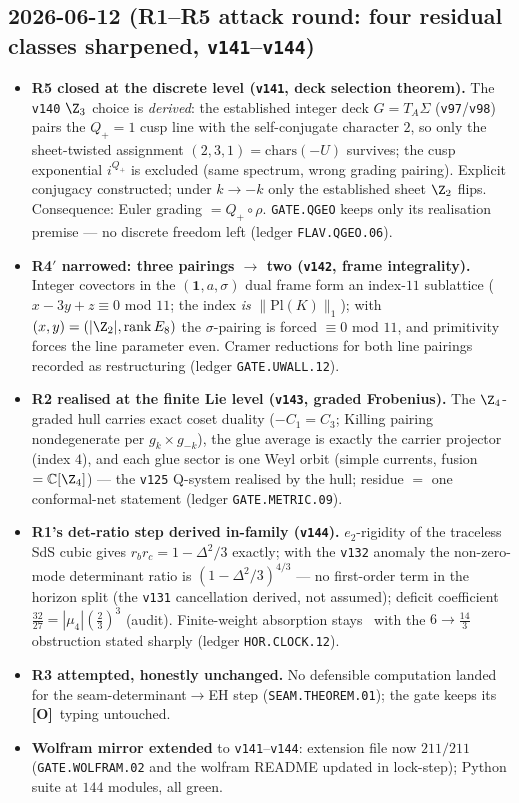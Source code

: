 \documentclass[11pt]{article}
\providecommand{\mO}{\textbf{[O]}}\providecommand{\mX}{\textbf{[X]}}
\providecommand{\vref}[1]{\texttt{#1}}
\begin{document}
\subsection*{2026-06-12 (R1--R5 attack round: four residual classes sharpened, \vref{v141}--\vref{v144})}
\begin{itemize}
\item \textbf{R5 closed at the discrete level (\vref{v141}, deck selection theorem).} The
  \vref{v140} $\Z_3$ choice is \emph{derived}: the established integer deck $G=T_A\Sigma$
  (\vref{v97}/\vref{v98}) pairs the $Q_+{=}1$ cusp line with the self-conjugate character
  $2$, so only the sheet-twisted assignment $(2,3,1)=\mathrm{chars}(-U)$ survives; the cusp
  exponential $i^{Q_+}$ is excluded (same spectrum, wrong grading pairing). Explicit
  conjugacy constructed; under $k\to-k$ only the established sheet $\Z_2$ flips.
  Consequence: Euler grading $=Q_+\!\circ\rho$. \texttt{GATE.QGEO} keeps only its
  realisation premise --- no discrete freedom left (ledger \texttt{FLAV.QGEO.06}).
\item \textbf{R4$'$ narrowed: three pairings $\to$ two (\vref{v142}, frame integrality).}
  Integer covectors in the $(\mathbf1,a,\sigma)$ dual frame form an index-$11$ sublattice
  ($x-3y+z\equiv0$ mod $11$; the index \emph{is} $\|\mathrm{Pl}(K)\|_1$); with
  $(x,y)=(|\Z_2|,\mathrm{rank}\,E_8)$ the $\sigma$-pairing is forced $\equiv0$ mod $11$,
  and primitivity forces the line parameter even. Cramer reductions for both line pairings
  recorded as restructuring (ledger \texttt{GATE.UWALL.12}).
\item \textbf{R2 realised at the finite Lie level (\vref{v143}, graded Frobenius).} The
  $\Z_4$-graded hull carries exact coset duality ($-C_1=C_3$; Killing pairing nondegenerate
  per $g_k\times g_{-k}$), the glue average is exactly the carrier projector (index $4$),
  and each glue sector is one Weyl orbit (simple currents, fusion $=\mathbb C[\Z_4]$) ---
  the \vref{v125} Q-system realised by the hull; residue $=$ one conformal-net statement
  (ledger \texttt{GATE.METRIC.09}).
\item \textbf{R1's det-ratio step derived in-family (\vref{v144}).} $e_2$-rigidity of the
  traceless SdS cubic gives $r_br_c=1-\Delta^2/3$ exactly; with the \vref{v132} anomaly the
  non-zero-mode determinant ratio is $(1-\Delta^2/3)^{4/3}$ --- no first-order term in the
  horizon split (the \vref{v131} cancellation derived, not assumed); deficit coefficient
  $\tfrac{32}{27}=|\mu_4|(\tfrac23)^3$ (audit). Finite-weight absorption stays \mC\ with the
  $6\to\tfrac{14}3$ obstruction stated sharply (ledger \texttt{HOR.CLOCK.12}).
\item \textbf{R3 attempted, honestly unchanged.} No defensible computation landed for the
  seam-determinant$\to$EH step (\texttt{SEAM.THEOREM.01}); the gate keeps its \mO\ typing
  untouched.
\item \textbf{Wolfram mirror extended} to \vref{v141}--\vref{v144}: extension file now
  $211/211$ (\texttt{GATE.WOLFRAM.02} and the wolfram README updated in lock-step); Python
  suite at $144$ modules, all green.
\end{itemize}
\end{document}
